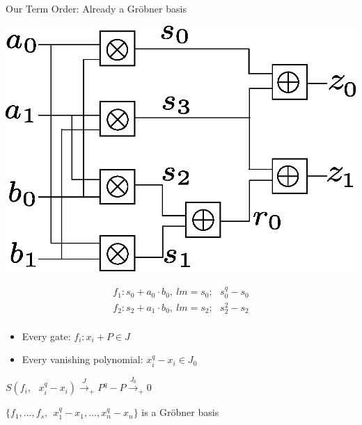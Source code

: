 \documentclass[xcolor=dvipsnames]{beamer}
\begin{document}
\begin{frame}{\large Our Term Order: Already a Gr\"obner basis}

\centerline{
\includegraphics[scale=0.4]{2bitmultiplier.eps}
}
\vspace{-0.3in}
\begin{align*}
f_1: s_0+a_0 \cdot b_0, \ lm=s_0; ~~~s_0^q - s_0 \nonumber \\
f_2: s_2+a_1 \cdot b_0, \ lm=s_2; ~~~s_2^2 - s_2 \nonumber \\
\end{align*}
\vspace{-0.5in}

\begin{itemize}
\item Every gate: $f_i: x_i + P \in J$
\item Every vanishing polynomial: $x_i^q - x_i \in J_0$
\end{itemize}
$S(f_i, ~~~x_i^q - x_i) \stackrel{J}{\textstyle\longrightarrow}_+ P^q -
P \stackrel{J_0}{\textstyle\longrightarrow}_+ 0
$

$\{f_1, \dots, f_s, ~~x_1^q - x_1, \dots, x_n^q - x_n \}$  is a
Gr\"obner basis
\end{frame}



\end{document}
